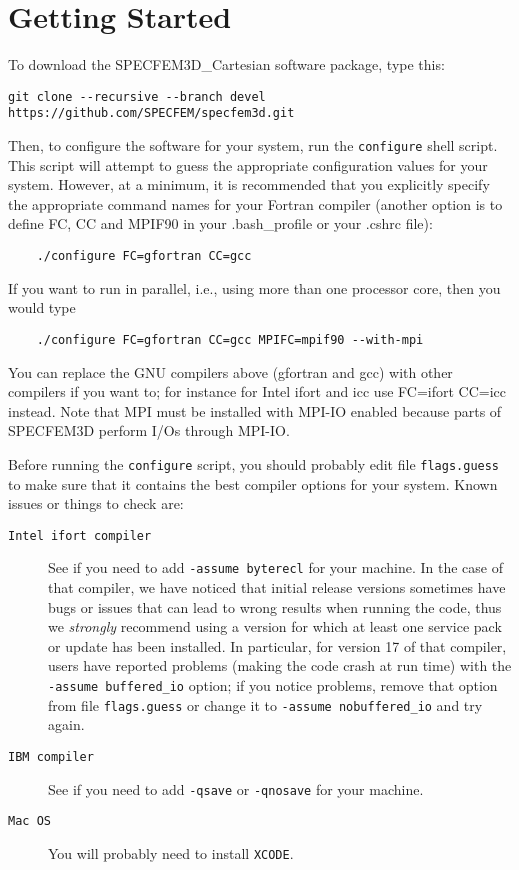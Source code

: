 \chapter{Getting Started}\label{cha:Getting-Started}

To download the SPECFEM3D\_Cartesian software package, type this:
\begin{verbatim}
git clone --recursive --branch devel https://github.com/SPECFEM/specfem3d.git
\end{verbatim}
%

Then, to configure the software for your system, run the
\texttt{configure} shell script. This script will attempt to guess
the appropriate configuration values for your system. However, at
a minimum, it is recommended that you explicitly specify the appropriate
command names for your Fortran compiler (another option is to define FC, CC and MPIF90 in your .bash\_profile
or your .cshrc file):
%
\begin{verbatim}
    ./configure FC=gfortran CC=gcc
\end{verbatim}
%
If you want to run in parallel, i.e., using more than one processor core, then you would type
%
\begin{verbatim}
    ./configure FC=gfortran CC=gcc MPIFC=mpif90 --with-mpi
\end{verbatim}

You can replace the GNU compilers above (gfortran and gcc) with other compilers if you want to; for instance for Intel ifort and icc use FC=ifort CC=icc instead. Note that MPI must be installed with MPI-IO enabled because parts of SPECFEM3D perform I/Os through MPI-IO.

Before running the \texttt{configure} script, you should probably
edit file \texttt{flags.guess} to make sure that it contains the best
compiler options for your system. Known issues or things to check
are:
\begin{description}
\item [{\texttt{Intel ifort compiler}}] See if you need to add \texttt{-assume byterecl} for your machine. In the case of that compiler, we have noticed that initial release versions sometimes have bugs or issues that can lead to wrong results when running the code, thus we \emph{strongly} recommend using a version for which at least one service pack or update has been installed.
In particular, for version 17 of that compiler, users have reported problems (making the code crash at run time) with the \texttt{-assume buffered\_io} option; if you notice problems,
remove that option from file \texttt{flags.guess} or change it to \texttt{-assume nobuffered\_io} and try again.

\item [{\texttt{IBM compiler}}] See if you need to add \texttt{-qsave}
or \texttt{-qnosave} for your machine.

\item [{\texttt{Mac OS}}] You will probably need to install \texttt{XCODE}.
\end{description}

